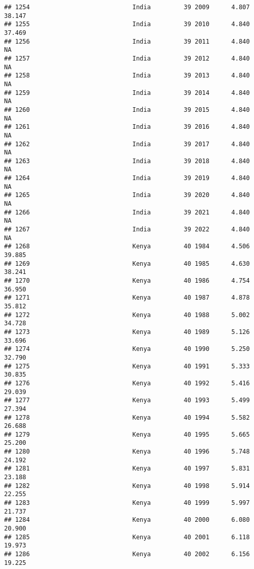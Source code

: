 \documentclass[
]{article}
\begin{document}
\begin{verbatim}
## 1254                            India         39 2009      4.807     38.147
## 1255                            India         39 2010      4.840     37.469
## 1256                            India         39 2011      4.840         NA
## 1257                            India         39 2012      4.840         NA
## 1258                            India         39 2013      4.840         NA
## 1259                            India         39 2014      4.840         NA
## 1260                            India         39 2015      4.840         NA
## 1261                            India         39 2016      4.840         NA
## 1262                            India         39 2017      4.840         NA
## 1263                            India         39 2018      4.840         NA
## 1264                            India         39 2019      4.840         NA
## 1265                            India         39 2020      4.840         NA
## 1266                            India         39 2021      4.840         NA
## 1267                            India         39 2022      4.840         NA
## 1268                            Kenya         40 1984      4.506     39.885
## 1269                            Kenya         40 1985      4.630     38.241
## 1270                            Kenya         40 1986      4.754     36.950
## 1271                            Kenya         40 1987      4.878     35.812
## 1272                            Kenya         40 1988      5.002     34.728
## 1273                            Kenya         40 1989      5.126     33.696
## 1274                            Kenya         40 1990      5.250     32.790
## 1275                            Kenya         40 1991      5.333     30.835
## 1276                            Kenya         40 1992      5.416     29.039
## 1277                            Kenya         40 1993      5.499     27.394
## 1278                            Kenya         40 1994      5.582     26.688
## 1279                            Kenya         40 1995      5.665     25.200
## 1280                            Kenya         40 1996      5.748     24.192
## 1281                            Kenya         40 1997      5.831     23.188
## 1282                            Kenya         40 1998      5.914     22.255
## 1283                            Kenya         40 1999      5.997     21.737
## 1284                            Kenya         40 2000      6.080     20.900
## 1285                            Kenya         40 2001      6.118     19.973
## 1286                            Kenya         40 2002      6.156     19.225

\end{verbatim}
\end{document}
